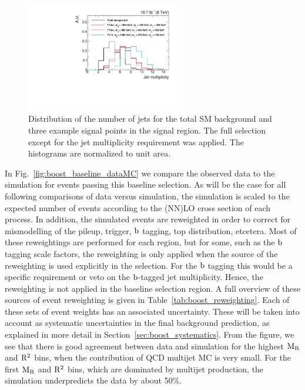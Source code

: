\begin{figure}[htbp]
 \centering
 \includegraphics[width=0.6\textwidth]{figures/razor_selection/njets_signal_region}
 \caption{Distribution of the number of jets for the total SM background and three example signal
points in the signal region. The full selection except for the jet multiplicity requirement was
applied. The histograms are normalized to unit area.
 \label{fig:njets_sig_BG}}
\end{figure}

In Fig.~\ref{fig:boost_baseline_dataMC} we compare the observed data to the simulation for
events passing this baseline selection. 
As will be the case for all following comparisons of data versus simulation, the simulation is
scaled to the expected number of events according to the (NN)LO cross section of each process.
In addition, the simulated events are reweighted in order to correct for mismodelling of the
pileup, trigger, $\mathrm{b}$ tagging, top \pt distribution, etcetera. Most of these reweightings are
performed for each region, but for some, such as the $\mathrm{b}$ tagging scale factors, the reweighting
is only applied when the source of the reweighting is used explicitly in the selection. For the
$\mathrm{b}$ tagging this would be a specific requirement or veto on the $\mathrm{b}$-tagged jet
multiplicity. Hence, the reweighting is not applied in the baseline selection region. 
A full overview of these sources of event reweighting is given in
Table~\ref{tab:boost_reweighting}. Each of these sets of event weights has an associated
uncertainty. These will be taken into account as systematic uncertainties in the final background
prediction, as explained in more detail in Section~\ref{sec:boost_systematics}. 
From the figure, we see that there is good agreement between data and simulation for the highest
$\mathrm{M_R}$ and $\mathrm{R^2}$ bins, \ie when the contribution of QCD multijet MC is very small. 
For the first $\mathrm{M_R}$ and $\mathrm{R^2}$ bins, which are dominated by multijet production, the simulation
underpredicts the data by about 50\%. 

